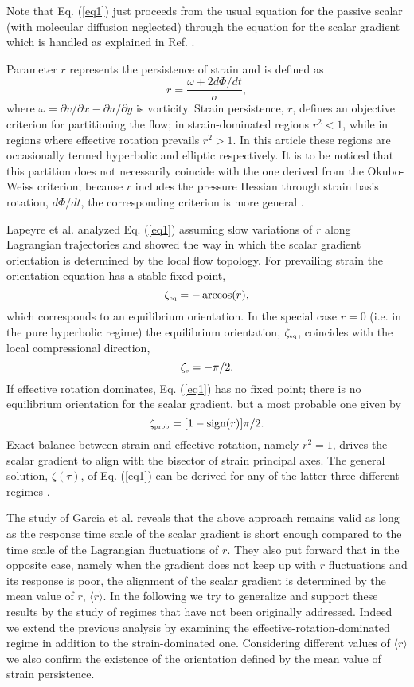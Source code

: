 \documentclass[doublespacing]{elsart}
\begin{document}
Note that Eq. (\ref{eq1}) 
just
proceeds from the usual equation for the passive scalar
(with molecular diffusion neglected) through the equation
for the scalar gradient \cite{Bal03,G06} which is 
handled
as explained in Ref. \cite{Lal99}.

Parameter $ r $ represents the persistence of strain
\cite{Lal99,DT91}
and is defined as
\[
r =
\frac{\omega + 2 d \Phi/d t}{\sigma},
\]
where
$ \omega = \partial v/\partial x - \partial u/\partial y $ is vorticity.
Strain persistence, $ r $, defines an objective criterion
for partitioning the flow; in strain-dominated regions
$ r^2 < 1 $, while in regions where effective rotation
prevails $ r^2 > 1 $.
In  
this article
these regions are occasionally termed hyperbolic and
elliptic respectively.
It is to be noticed that        
this partition 
does not necessarily coincide with
the one derived from the Okubo-Weiss criterion;
because
$ r $ includes the pressure Hessian through
strain basis rotation,
$ d \Phi/d t $,
the corresponding criterion
is more general
\cite{HK98}.

Lapeyre et al. \cite{Lal99}
analyzed Eq. (\ref{eq1})
assuming slow variations of $ r $ along Lagrangian
trajectories and showed the
way in which the
scalar gradient orientation is determined by the local
flow topology. 
For prevailing strain the orientation equation has a 
stable fixed point,
\[
\zeta_{\mbox{\tiny eq}} = - \arccos(r),
\]
which
corresponds to an equilibrium orientation. In the special      
case $ r = 0 $
(i.e. in the pure hyperbolic regime) the equilibrium
orientation, $ \zeta_{\mbox{\tiny eq}} $, coincides with the local
compressional direction,
\[
\zeta_{\mbox{\tiny c}} = -\pi/2.
\]
If effective rotation dominates, 
Eq. (\ref{eq1}) has no fixed point; there is no equilibrium
orientation for the scalar gradient, but a most probable
one given by 
\[
\zeta_{\mbox{\tiny prob}}
= [1 - \mbox{sign}(r)] \pi/2.
\]
Exact balance between strain and effective rotation, namely
$ r^2 =1 $,
drives the scalar gradient to align with the bisector
of strain principal axes.
The general solution, $ \zeta(\tau) $, of Eq. (\ref{eq1})
can be derived for any of the latter three different regimes
\cite{Lal99}.

The study 
of
Garcia et al. \cite{Gal05}  
reveals
that the above approach remains valid
as long as 
the response 
time scale of the scalar gradient is short enough
compared to the time scale of the Lagrangian fluctuations
of $ r $.
They also put forward that
in the opposite case, namely 
when the gradient does 
not keep up with $ r $ fluctuations
and its response is poor,
the alignment of the scalar gradient
is
determined
by the mean value of $ r $, 
$ \langle r \rangle $.
In the following 
we try to generalize 
and support
these results by
the study of
regimes that have not been originally addressed.
Indeed we extend the previous analysis by examining the 
effective-rotation-dominated regime in addition to the strain-dominated one.
Considering
different values of $ \langle r \rangle $
we also confirm the existence of the orientation defined by the mean value
of strain persistence. 
\end{document}
